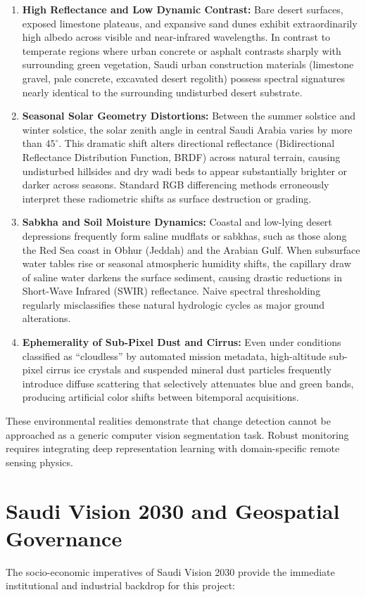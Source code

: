 \begin{enumerate}
    \item \textbf{High Reflectance and Low Dynamic Contrast:} Bare desert surfaces, exposed limestone plateaus, and expansive sand dunes exhibit extraordinarily high albedo across visible and near-infrared wavelengths. In contrast to temperate regions where urban concrete or asphalt contrasts sharply with surrounding green vegetation, Saudi urban construction materials (limestone gravel, pale concrete, excavated desert regolith) possess spectral signatures nearly identical to the surrounding undisturbed desert substrate.
    \item \textbf{Seasonal Solar Geometry Distortions:} Between the summer solstice and winter solstice, the solar zenith angle in central Saudi Arabia varies by more than $45^\circ$. This dramatic shift alters directional reflectance (Bidirectional Reflectance Distribution Function, BRDF) across natural terrain, causing undisturbed hillsides and dry wadi beds to appear substantially brighter or darker across seasons. Standard RGB differencing methods erroneously interpret these radiometric shifts as surface destruction or grading.
    \item \textbf{Sabkha and Soil Moisture Dynamics:} Coastal and low-lying desert depressions frequently form saline mudflats or sabkhas, such as those along the Red Sea coast in Obhur (Jeddah) and the Arabian Gulf. When subsurface water tables rise or seasonal atmospheric humidity shifts, the capillary draw of saline water darkens the surface sediment, causing drastic reductions in Short-Wave Infrared (SWIR) reflectance. Naive spectral thresholding regularly misclassifies these natural hydrologic cycles as major ground alterations.
    \item \textbf{Ephemerality of Sub-Pixel Dust and Cirrus:} Even under conditions classified as ``cloudless'' by automated mission metadata, high-altitude sub-pixel cirrus ice crystals and suspended mineral dust particles frequently introduce diffuse scattering that selectively attenuates blue and green bands, producing artificial color shifts between bitemporal acquisitions.
\end{enumerate}

These environmental realities demonstrate that change detection cannot be approached as a generic computer vision segmentation task. Robust monitoring requires integrating deep representation learning with domain-specific remote sensing physics.

\section{Saudi Vision 2030 and Geospatial Governance}
\label{sec:intro_vision2030}
The socio-economic imperatives of Saudi Vision 2030 provide the immediate institutional and industrial backdrop for this project:


